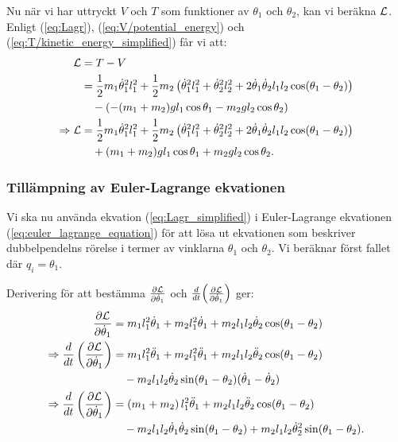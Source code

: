 Nu när vi har uttryckt $V$ och $T$ som funktioner av $\theta_1$ och $\theta_2$, kan vi beräkna $\mathcal{L}$. Enligt (\ref{eq:Lagr}), (\ref{eq:V/potential_energy}) och (\ref{eq:T/kinetic_energy_simplified}) får vi att:
\begin{align}
    \mathcal{L}               &= T - V \notag \\
                        &= \frac{1}{2}m_1\dot{\theta}_1^2l_1^2 + \frac{1}{2}m_2\left(\dot{\theta}_1^2l_1^2 + \dot{\theta}_2^2l_2^2 + 2\dot{\theta}_1\dot{\theta}_2l_1l_2\cos(\theta_1-\theta_2)\right) \notag \\
                        &\quad - \left(-(m_1 + m_2)gl_1\cos{\theta_1} - m_2gl_2\cos{\theta_2}\right) \notag \\
    \Rightarrow \mathcal{L}   &= \frac{1}{2}m_1\dot{\theta}_1^2l_1^2 + \frac{1}{2}m_2\left(\dot{\theta}_1^2l_1^2 + \dot                {\theta}_2^2l_2^2 + 2\dot{\theta}_1\dot{\theta}_2l_1l_2\cos(\theta_1-\theta_2)\right) \notag \\
                        &\quad + (m_1 + m_2)gl_1\cos{\theta_1} + m_2gl_2\cos{\theta_2}. \label{eq:Lagr_simplified}
\end{align}

\subsubsection{Tillämpning av Euler-Lagrange ekvationen}

Vi ska nu använda ekvation (\ref{eq:Lagr_simplified}) i Euler-Lagrange ekvationen (\ref{eq:euler_lagrange_equation}) för att lösa ut ekvationen som beskriver dubbelpendelns rörelse i termer av vinklarna $\theta_1$ och $\theta_2$. Vi beräknar först fallet där $q_i=\theta_1$.

Derivering för att bestämma $ \frac{\partial \mathcal{L}}{\partial \dot{\theta}_1}$ och $\frac{d}{dt}\!\left(\frac{\partial \mathcal{L}}{\partial \dot{\theta}_1}\right)$ ger:
\begin{align}
    \frac{\partial \mathcal{L}}{\partial \dot{\theta}_1} &= m_1l_1^2\dot{\theta}_1+ m_2l_1^2\dot{\theta}_1 + m_2l_1l_2\dot{\theta}_2\cos(\theta_1-\theta_2) \notag \\
    \Rightarrow \frac{d}{dt}\left(\frac{\partial \mathcal{L}}{\partial \dot{\theta}_1}\right) &= m_1l_1^2\ddot{\theta}_1 + m_2l_1^2\ddot{\theta}_1 + m_2l_1l_2\ddot{\theta}_2\cos(\theta_1-\theta_2) \notag\\
    &\quad - m_2l_1l_2\dot{\theta}_2\sin(\theta_1-\theta_2)(\dot{\theta}_1-\dot{\theta}_2) \notag \\
    \Rightarrow \frac{d}{dt}\left(\frac{\partial \mathcal{L}}{\partial \dot{\theta}_1}\right) &= \left(m_1+m_2\right)l_1^2\ddot{\theta}_1 + m_2l_1l_2\ddot{\theta}_2\cos(\theta_1-\theta_2) \notag \\
    &\quad - m_2l_1l_2\dot{\theta}_1\dot{\theta}_2\sin(\theta_1-\theta_2) + m_2l_1l_2\dot{\theta}_2^2\sin(\theta_1-\theta_2). \label{eq:Lagr_time_derivative:respect_theta_1_dot}
\end{align}

